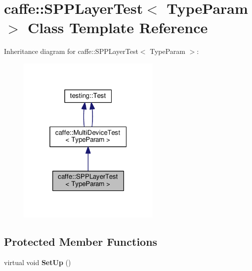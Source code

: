 \hypertarget{classcaffe_1_1_s_p_p_layer_test}{}\section{caffe\+:\+:S\+P\+P\+Layer\+Test$<$ Type\+Param $>$ Class Template Reference}
\label{classcaffe_1_1_s_p_p_layer_test}


Inheritance diagram for caffe\+:\+:S\+P\+P\+Layer\+Test$<$ Type\+Param $>$\+:
\nopagebreak
\begin{figure}[H]
\begin{center}
\leavevmode
\includegraphics[width=196pt]{classcaffe_1_1_s_p_p_layer_test__inherit__graph}
\end{center}
\end{figure}
\subsection*{Protected Member Functions}
\begin{DoxyCompactItemize}
\item 
\mbox{\label{classcaffe_1_1_s_p_p_layer_test_a90a4d5d3178c9041431bc68f7a77f653}} 
virtual void {\bfseries Set\+Up} ()
\end{DoxyCompactItemize}
